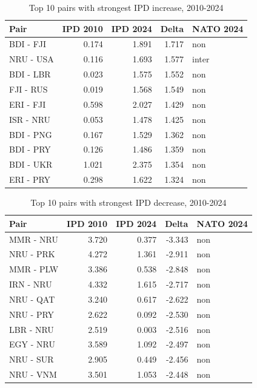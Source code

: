 \begin{table}[!h]
\centering
\caption{\label{tab:tab:movers_up}Top 10 pairs with strongest IPD increase, 2010-2024}
\centering
\begin{tabular}[t]{lrrrl}
\toprule
Pair & IPD 2010 & IPD 2024 & Delta & NATO 2024\\
\midrule
BDI - FJI & 0.174 & 1.891 & 1.717 & non\\
NRU - USA & 0.116 & 1.693 & 1.577 & inter\\
BDI - LBR & 0.023 & 1.575 & 1.552 & non\\
FJI - RUS & 0.019 & 1.568 & 1.549 & non\\
ERI - FJI & 0.598 & 2.027 & 1.429 & non\\
\addlinespace
ISR - NRU & 0.053 & 1.478 & 1.425 & non\\
BDI - PNG & 0.167 & 1.529 & 1.362 & non\\
BDI - PRY & 0.126 & 1.486 & 1.359 & non\\
BDI - UKR & 1.021 & 2.375 & 1.354 & non\\
ERI - PRY & 0.298 & 1.622 & 1.324 & non\\
\bottomrule
\end{tabular}
\end{table}

\begin{table}[!h]
\centering
\caption{\label{tab:tab:movers_dn}Top 10 pairs with strongest IPD decrease, 2010-2024}
\centering
\begin{tabular}[t]{lrrrl}
\toprule
Pair & IPD 2010 & IPD 2024 & Delta & NATO 2024\\
\midrule
MMR - NRU & 3.720 & 0.377 & -3.343 & non\\
NRU - PRK & 4.272 & 1.361 & -2.911 & non\\
MMR - PLW & 3.386 & 0.538 & -2.848 & non\\
IRN - NRU & 4.332 & 1.615 & -2.717 & non\\
NRU - QAT & 3.240 & 0.617 & -2.622 & non\\
\addlinespace
NRU - PRY & 2.622 & 0.092 & -2.530 & non\\
LBR - NRU & 2.519 & 0.003 & -2.516 & non\\
EGY - NRU & 3.589 & 1.092 & -2.497 & non\\
NRU - SUR & 2.905 & 0.449 & -2.456 & non\\
NRU - VNM & 3.501 & 1.053 & -2.448 & non\\
\bottomrule
\end{tabular}
\end{table}
